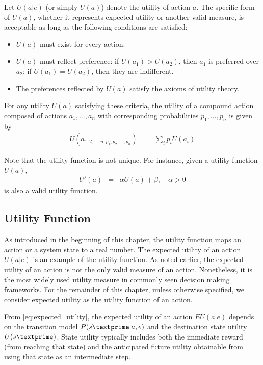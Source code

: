 \begin{mdframed}
	Let $U(a|e)$ (or simply $U(a)$) denote the utility of action $a$. The specific form of $U(a)$, whether it represents expected utility or another valid measure, is acceptable as long as the following conditions are satisfied:
	\begin{itemize}
		\item $U(a)$ must exist for every action.
		\item $U(a)$ must reflect preference: if $U(a_1) > U(a_2)$, then $a_1$ is preferred over $a_2$; if $U(a_1) = U(a_2)$, then they are indifferent.
		\item The preferences reflected by $U(a)$ satisfy the axioms of utility theory.
	\end{itemize}
	
	For any utility $U(a)$ satisfying these criteria, the utility of a compound action composed of actions $a_1, \dots, a_n$ with corresponding probabilities $p_1, \dots, p_n$ is given by
	\begin{eqnarray}
		U(a_{1,2,\dots,n,p_1,p_2,\dots,p_n}) &=& \sum_i p_i U(a_i) \nonumber
	\end{eqnarray}
	
	Note that the utility function is not unique. For instance, given a utility function $U(a)$,
	\begin{eqnarray}
		U'(a) &=& \alpha U(a) + \beta, \quad \alpha > 0 \nonumber
	\end{eqnarray}
	is also a valid utility function.
	
\end{mdframed}

\subsection{Utility Function}

As introduced in the beginning of this chapter, the utility function maps an action or a system state to a real number. The expected utility of an action $U(a|e)$ is an example of the utility function. As noted earlier, the expected utility of an action is not the only valid measure of an action. Nonetheless, it is the most widely used utility measure in commonly seen decision making frameworks. For the remainder of this chapter, unless otherwise specified, we consider expected utility as the utility function of an action.

From \eqref{eq:expected_utility}, the expected utility of an action $EU(a|e)$ depends on the transition model $P(s\textprime|a,e)$ and the destination state utility $U(s\textprime)$. State utility typically includes both the immediate reward (from reaching that state) and the anticipated future utility obtainable from using that state as an intermediate step.

